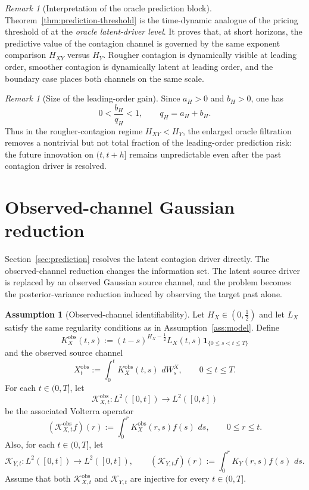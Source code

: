 \documentclass[11pt,a4paper]{amsart}
\theoremstyle{plain}
\theoremstyle{definition}
\newtheorem{assumption}[theorem]{Assumption}
\theoremstyle{remark}
\newtheorem{remark}[theorem]{Remark}
\newcommand{\dd}{\,d}
\newcommand{\one}{\mathbf 1}
\begin{document}
\begin{remark}[Interpretation of the oracle prediction block]
Theorem~\ref{thm:prediction-threshold} is the time-dynamic analogue of the pricing
threshold of \cite{vidal2026latent} at the \emph{oracle latent-driver level}.  It proves that,
at short horizons, the predictive value of the contagion channel is governed by the same exponent
comparison $H_{XY}$ versus $H_Y$.  Rougher contagion is dynamically visible at leading order,
smoother contagion is dynamically latent at leading order, and the boundary case places both
channels on the same scale.
\end{remark}

\begin{remark}[Size of the leading-order gain]
Since $a_H>0$ and $b_H>0$, one has
\[
0<\frac{b_H}{q_H}<1,
\qquad q_H=a_H+b_H.
\]
Thus in the rougher-contagion regime $H_{XY}<H_Y$, the enlarged oracle filtration removes
a nontrivial but not total fraction of the leading-order prediction risk: the future
innovation on $(t,t+h]$ remains unpredictable even after the past contagion driver is
resolved.
\end{remark}

\section{Observed-channel Gaussian reduction}\label{sec:observed}

Section~\ref{sec:prediction} resolves the latent contagion driver directly.  The observed-channel
reduction changes the information set.  The latent source driver is replaced by an observed
Gaussian source channel, and the problem becomes the posterior-variance reduction induced by
observing the target past alone.

\begin{assumption}[Observed-channel identifiability]
\label{ass:obs-source}
Let $H_X\in(0,\tfrac12)$ and let $L_X$ satisfy the same regularity conditions as in
Assumption~\ref{ass:model}. Define
\[
K_X^{\mathrm{obs}}(t,s):=(t-s)^{H_X-\frac12}L_X(t,s)\one_{\{0\le s<t\le T\}}
\]
and the observed source channel
\begin{equation}\label{eq:Xobs}
X_t^{\mathrm{obs}}
:=
\int_0^t K_X^{\mathrm{obs}}(t,s)\,\dd W_s^X,
\qquad 0\le t\le T.
\end{equation}
For each $t\in(0,T]$, let
\[
\mathcal K_{X,t}^{\mathrm{obs}}:L^2([0,t])\to L^2([0,t])
\]
be the associated Volterra operator
\[
(\mathcal K_{X,t}^{\mathrm{obs}}f)(r)
:=
\int_0^r K_X^{\mathrm{obs}}(r,s)f(s)\,\dd s,
\qquad 0\le r\le t.
\]
Also, for each $t\in(0,T]$, let
\[
\mathcal K_{Y,t}:L^2([0,t])\to L^2([0,t]),
\qquad
(\mathcal K_{Y,t}f)(r):=\int_0^r K_Y(r,s)f(s)\,\dd s.
\]
Assume that both $\mathcal K_{X,t}^{\mathrm{obs}}$ and $\mathcal K_{Y,t}$ are injective
for every $t\in(0,T]$.
\end{assumption}
\end{document}
